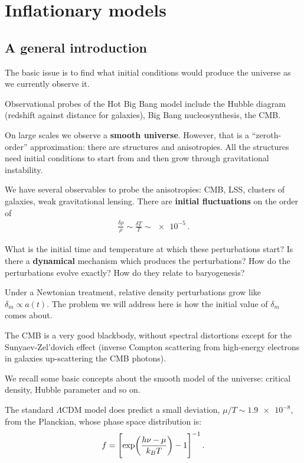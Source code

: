 \documentclass[main.tex]{subfiles}
\begin{document}
\chapter{Inflationary models}

\section{A general introduction}

The basic issue is to find what initial conditions would produce the universe as we currently observe it.

Observational probes of the Hot Big Bang model include the Hubble diagram (redshift against distance for galaxies), Big Bang nucleosynthesis, the CMB. 

On large scales we observe a \textbf{smooth universe}. However, that is a ``zeroth-order'' approximation: there are structures and anisotropies. 
All the structures need initial conditions to start from and then grow through gravitational instability. 

We have several observables to probe the anisotropies: CMB, LSS, clusters of galaxies, weak gravitational lensing. 
There are \textbf{initial fluctuations} on the order of 
%
\begin{align}
\frac{ \delta \rho }{\rho } \sim \frac{ \delta T}{T} \sim \num{e-5}
\,.
\end{align}

What is the initial time and temperature at which these perturbations start? Is there a \textbf{dynamical} mechanism which produces the perturbations? 
How do the perturbations evolve exactly? 
How do they relate to baryogenesis?

Under a Newtonian treatment, relative density perturbations grow like \(\delta _m \propto a(t)\). 
The problem we will address here is how the initial value of \(\delta _m\) comes about. 

The CMB is a very good blackbody, without spectral distortions except for the Sunyaev-Zel'dovich effect (inverse Compton scattering from high-energy electrons in galaxies up-scattering the CMB photons). 

We recall some basic concepts about the smooth model of the universe: critical density, Hubble parameter and so on. 

The standard \(\Lambda \)CDM model does predict a small deviation, \(\mu / T \sim \num{1.9e-8}\), from the Planckian, whose phase space distribution is: 
%
\begin{align}
f = \qty[\exp(\frac{h \nu - \mu }{k_B T}) - 1]^{-1}
\,.
\end{align}
\end{document}

